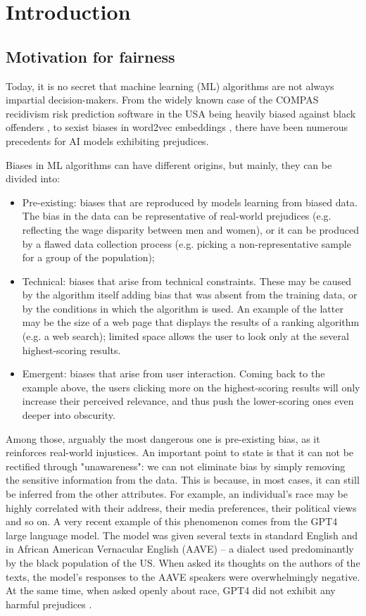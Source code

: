 \chapter{Introduction}
\label{introduction}


\section{Motivation for fairness}\label{sect:int_1}

Today, it is no secret that machine learning (ML) algorithms are not always impartial decision-makers. From the widely known case of the COMPAS recidivism risk prediction software in the USA being heavily biased against black offenders \cite{propublicacompas}, to sexist biases in word2vec embeddings \cite{1607.06520}, there have been numerous precedents for AI models exhibiting prejudices.

Biases in ML algorithms can have different origins, but mainly, they can be divided into:
\begin{itemize}
\item Pre-existing: biases that are reproduced by models learning from biased data. The bias in the data can be representative of real-world prejudices (e.g. reflecting the wage disparity between men and women), or it can be produced by a flawed data collection process (e.g. picking a non-representative sample for a group of the population);
\item Technical: biases that arise from technical constraints. These may be caused by the algorithm itself adding bias that was absent from the training data, or by the conditions in which the algorithm is used. An example of the latter may be the size of a web page that displays the results of a ranking algorithm (e.g. a web search); limited space allows the user to look only at the several highest-scoring results.
\item Emergent: biases that arise from user interaction. Coming back to the example above, the users clicking more on the highest-scoring results will only increase their perceived relevance, and thus push the lower-scoring ones even deeper into obscurity.
\end{itemize}

Among those, arguably the most dangerous one is pre-existing bias, as it reinforces real-world injustices. An important point to state is that it can not be rectified through "unawareness": we can not eliminate bias by simply removing the sensitive information from the data. This is because, in most cases, it can still be inferred from the other attributes. For example, an individual’s race may be highly correlated with their address, their media preferences, their political views and so on. A very recent example of this phenomenon comes from the GPT4 large language model. The model was given several texts in standard English and in African American Vernacular English (AAVE) – a dialect used predominantly by the black population of the US. When asked its thoughts on the authors of the texts, the model’s responses to the AAVE speakers were overwhelmingly negative. At the same time, when asked openly about race, GPT4 did not exhibit any harmful prejudices \cite{2403.00742}.

